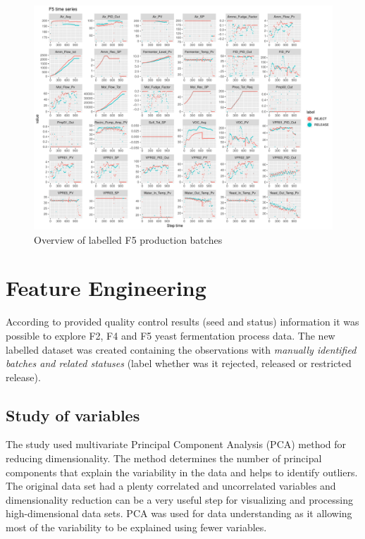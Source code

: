 \documentclass{article}
\begin{document}
\begin{figure}[ht]
    \centering
    \includegraphics[width=1.1\textwidth]{f5_plot}
    \caption{Overview of labelled F5 production batches}
    \label{fig:f5series}
\end{figure}

\section{Feature Engineering}
According to provided quality control results (seed and status) information it was possible to explore F2, F4 and F5 yeast fermentation process data. The new labelled dataset was created containing the observations with \emph{manually identified batches and related statuses} (label whether was it rejected, released or restricted release).

\subsection{Study of variables}
The study used multivariate Principal Component Analysis (PCA) method for reducing dimensionality. The method determines the number of principal components that explain the variability in the data and helps to identify outliers. The original data set had a plenty correlated and uncorrelated variables and dimensionality reduction can be a very useful step for visualizing and processing high-dimensional data sets.  PCA was used for data understanding as it allowing most of the variability to be explained using fewer variables.
\end{document}
